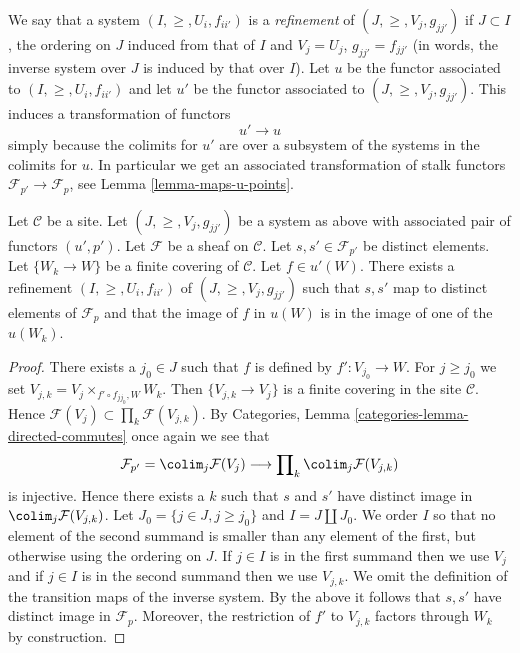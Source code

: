 \medskip\noindent
We say that a system $(I, \geq, U_i, f_{ii'})$
is a {\it refinement} of $(J, \geq, V_j, g_{jj'})$ if
$J \subset I$, the ordering on $J$ induced from that of $I$
and $V_j = U_j$, $g_{jj'} = f_{jj'}$ (in words, the inverse system
over $J$ is induced by that over $I$). Let $u$ be the functor
associated to $(I, \geq, U_i, f_{ii'})$ and let $u'$ be the
functor associated to $(J, \geq, V_j, g_{jj'})$.
This induces a transformation of functors
$$
u' \longrightarrow u
$$
simply because the colimits for $u'$ are over a subsystem
of the systems in the colimits for $u$.
In particular we get an associated transformation of
stalk functors $\mathcal{F}_{p'} \to \mathcal{F}_p$,
see Lemma \ref{lemma-maps-u-points}.

\begin{lemma}
\label{lemma-refine}
Let $\mathcal{C}$ be a site.
Let $(J, \geq, V_j, g_{jj'})$ be a system as above with associated
pair of functors $(u', p')$.
Let $\mathcal{F}$ be a sheaf on $\mathcal{C}$.
Let $s, s' \in \mathcal{F}_{p'}$ be distinct elements.
Let $\{W_k \to W\}$ be a finite covering of $\mathcal{C}$.
Let $f \in u'(W)$.
There exists a refinement $(I, \geq, U_i, f_{ii'})$
of $(J, \geq, V_j, g_{jj'})$ such that $s, s'$ map
to distinct elements of $\mathcal{F}_p$ and that
the image of $f$ in $u(W)$ is in the image of one of
the $u(W_k)$.
\end{lemma}

\begin{proof}
There exists a $j_0 \in J$ such that $f$ is defined by $f' : V_{j_0} \to W$.
For $j \geq j_0$ we set $V_{j, k} = V_j \times_{f'\circ f_{j j_0}, W} W_k$.
Then $\{V_{j, k} \to V_j\}$ is a finite covering in the site
$\mathcal{C}$. Hence
$\mathcal{F}(V_j) \subset \prod_k \mathcal{F}(V_{j, k})$.
By Categories, Lemma \ref{categories-lemma-directed-commutes}
once again we see that
$$
\mathcal{F}_{p'} =
\colim_j \mathcal{F}(V_j)
\longrightarrow
\prod\nolimits_k \colim_j \mathcal{F}(V_{j, k})
$$
is injective. Hence there exists a $k$ such that $s$ and $s'$
have distinct image in $\colim_j \mathcal{F}(V_{j, k})$.
Let $J_0 = \{j \in J, j \geq j_0\}$ and $I = J \amalg J_0$.
We order $I$ so that no element of the second summand
is smaller than any element of the first, but otherwise
using the ordering on $J$. If $j \in I$ is in the first
summand then we use $V_j$ and if $j \in I$ is in the second
summand then we use $V_{j, k}$. We omit the definition
of the transition maps of the inverse system. By the above
it follows that $s, s'$ have distinct image in $\mathcal{F}_p$.
Moreover, the restriction of $f'$ to $V_{j, k}$ factors
through $W_k$ by construction.
\end{proof}

